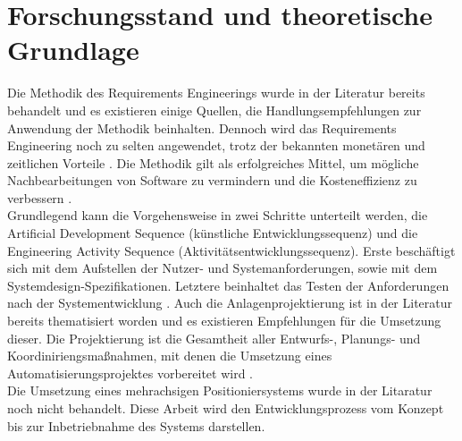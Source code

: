 \documentclass[12pt, a4paper, twoside]{article} %
\begin{document}
\section{Forschungsstand und theoretische Grundlage}
Die Methodik des Requirements Engineerings wurde in der Literatur bereits behandelt und es existieren einige Quellen, die Handlungsempfehlungen zur Anwendung der Methodik beinhalten. Dennoch wird das Requirements Engineering noch zu selten angewendet, trotz der bekannten monetären und zeitlichen Vorteile \cite[xvii]{Laplante2014}. Die Methodik gilt als erfolgreiches Mittel, um mögliche Nachbearbeitungen von Software zu vermindern und die Kosteneffizienz zu verbessern \cite[1]{
Laplante2014}.\\
Grundlegend kann die Vorgehensweise in zwei Schritte unterteilt werden, die \glqq Artificial Development Sequence\grqq{} (künstliche Entwicklungssequenz) und die \glqq Engineering Activity Sequence\grqq{} (Aktivitätsentwicklungssequenz). Erste beschäftigt sich mit dem Aufstellen der Nutzer- und Systemanforderungen, sowie mit dem Systemdesign-Spezifikationen. Letztere beinhaltet das Testen der Anforderungen nach der Systementwicklung \cite[6]{
Laplante2014}.
Auch die Anlagenprojektierung ist in der Literatur bereits thematisiert worden und es existieren Empfehlungen für die Umsetzung dieser. Die Projektierung ist die Gesamtheit aller Entwurfs-, Planungs- und Koordiniriengsmaßnahmen, mit denen die Umsetzung eines Automatisierungsprojektes vorbereitet wird \cite[8]{Bindel2017}.\\
Die Umsetzung eines mehrachsigen Positioniersystems wurde in der Litaratur noch nicht behandelt. Diese Arbeit wird den Entwicklungsprozess vom Konzept bis zur Inbetriebnahme des Systems darstellen. 
\end{document}
